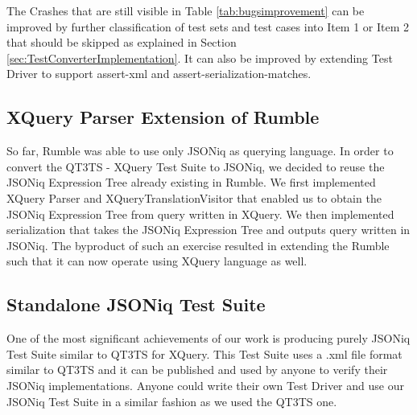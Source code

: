 The Crashes that are still visible in Table \ref{tab:bugsimprovement} can be improved by further classification of test sets and test cases into Item 1 or Item 2 that should be skipped as explained in Section \ref{sec:TestConverterImplementation}. It can also be improved by extending Test Driver to support assert-xml and assert-serialization-matches.

\subsection{XQuery Parser Extension of Rumble}
So far, Rumble was able to use only JSONiq as querying language. In order to convert the QT3TS - XQuery Test Suite to JSONiq, we decided to reuse the JSONiq Expression Tree already existing in Rumble. We first implemented XQuery Parser and XQueryTranslationVisitor that enabled us to obtain the JSONiq Expression Tree from query written in XQuery. We then implemented serialization that takes the JSONiq Expression Tree and outputs query written in JSONiq. The byproduct of such an exercise resulted in extending the Rumble such that it can now operate using XQuery language as well.

\subsection{Standalone JSONiq Test Suite}
One of the most significant achievements of our work is producing purely JSONiq Test Suite similar to QT3TS for XQuery. This Test Suite uses a .xml file format similar to QT3TS and it can be published and used by anyone to verify their JSONiq implementations. Anyone could write their own Test Driver and use our JSONiq Test Suite in a similar fashion as we used the QT3TS one.

